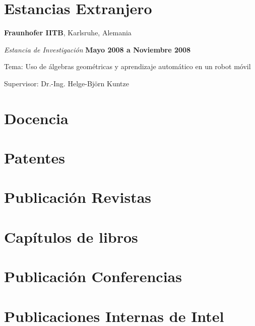 \section{Estancias Extranjero}
%
\textbf{Fraunhofer IITB},
Karlsruhe, Alemania
\begin{outerlist}
\item[] \textit{Estancia de Investigación}%
    \hfill \textbf{Mayo 2008 a Noviembre 2008}
    \begin{innerlist}
        \item Tema: Uso de álgebras geométricas y aprendizaje automático
              en un robot móvil
        \item Supervisor: Dr.-Ing. Helge-Bj{\"o}rn Kuntze
    \end{innerlist}
\end{outerlist}


\section{Docencia}

\blankline

\section{Patentes}

\blankline

\section{Publicación Revistas}

\blankline

\section{Capítulos de libros}


\section{Publicación Conferencias}


\section{Publicaciones Internas de Intel}

\blankline

